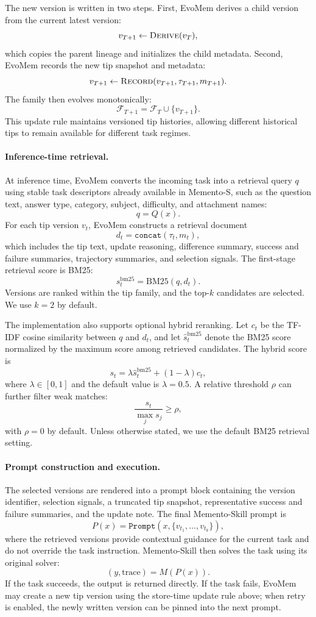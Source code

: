 \documentclass{article}
\begin{document}
The new version is written in two steps. First, EvoMem derives a child version from the current latest version:
\[
v_{T+1} \leftarrow \textsc{Derive}(v_T),
\]
which copies the parent lineage and initializes the child metadata. Second, EvoMem records the new tip snapshot and metadata:
\[
v_{T+1} \leftarrow \textsc{Record}(v_{T+1},\tau_{T+1},m_{T+1}).
\]
The family then evolves monotonically:
\[
\mathcal{F}_{T+1}=\mathcal{F}_T\cup\{v_{T+1}\}.
\]
This update rule maintains versioned tip histories, allowing different historical tips to remain available for different task regimes.

\paragraph{Inference-time retrieval.}
At inference time, EvoMem converts the incoming task into a retrieval query $q$ using stable task descriptors already available in Memento-S, such as the question text, answer type, category, subject, difficulty, and attachment names:
\[
q = Q(x).
\]
For each tip version $v_t$, EvoMem constructs a retrieval document
\[
d_t=\texttt{concat}(\tau_t,m_t),
\]
which includes the tip text, update reasoning, difference summary, success and failure summaries, trajectory summaries, and selection signals. The first-stage retrieval score is BM25:
\[
s_t^{\mathrm{bm25}}=\mathrm{BM25}(q,d_t).
\]
Versions are ranked within the tip family, and the top-$k$ candidates are selected. We use $k=2$ by default.

The implementation also supports optional hybrid reranking. Let $c_t$ be the TF-IDF cosine similarity between $q$ and $d_t$, and let $\hat{s}_t^{\mathrm{bm25}}$ denote the BM25 score normalized by the maximum score among retrieved candidates. The hybrid score is
\[
s_t =
\lambda \hat{s}_t^{\mathrm{bm25}} + (1-\lambda)c_t,
\]
where $\lambda\in[0,1]$ and the default value is $\lambda=0.5$. A relative threshold $\rho$ can further filter weak matches:
\[
\frac{s_t}{\max_j s_j}\ge \rho,
\]
with $\rho=0$ by default. Unless otherwise stated, we use the default BM25 retrieval setting.

\paragraph{Prompt construction and execution.}
The selected versions are rendered into a prompt block containing the version identifier, selection signals, a truncated tip snapshot, representative success and failure summaries, and the update note. The final Memento-Skill prompt is
\[
P(x)=\texttt{Prompt}\!\left(x,\{v_{t_1},\ldots,v_{t_k}\}\right),
\]
where the retrieved versions provide contextual guidance for the current task and do not override the task instruction. Memento-Skill then solves the task using its original solver:
\[
(y,\mathrm{trace}) = M(P(x)).
\]
If the task succeeds, the output is returned directly. If the task fails, EvoMem may create a new tip version using the store-time update rule above; when retry is enabled, the newly written version can be pinned into the next prompt.
\end{document}
